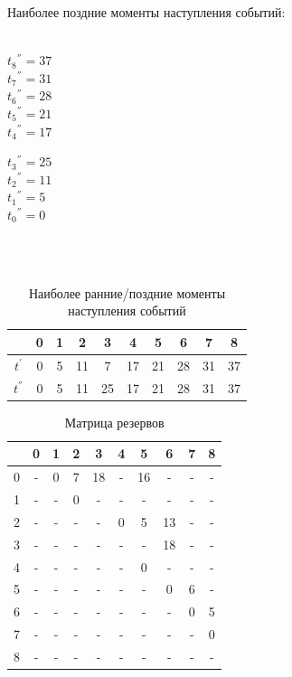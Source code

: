 \documentclass[a4paper,14pt]{extarticle}
\begin{document}
Наиболее поздние моменты наступления событий:\\\\

\begin{minipage}{0.4\textwidth}
\begin{center}
 ${t_8}^{''} = 37$ \\
 ${t_7}^{''} = 31$ \\
 ${t_6}^{''} = 28$ \\
 ${t_5}^{''} = 21$ \\
 ${t_4}^{''} = 17$
\end{center}
\end{minipage}
\hfill
\begin{minipage}{0.5\textwidth}
\begin{center}
 ${t_3}^{''} = 25$ \\
 ${t_2}^{''} = 11$ \\
 ${t_1}^{''} = 5$ \\
 ${t_0}^{''} = 0$
\end{center}
\end{minipage}\\\\

\begin{table}[H]
\caption{Наиболее ранние/поздние моменты наступления событий}
\label{tabular:timesandtenses}
\begin{center}
\begin{tabular}{|c|c|c|c|c|c|c|c|c|c|}
\hline
  & 0 & 1 & 2 & 3 & 4 & 5 & 6 & 7 & 8\\ \hline
${t}^{'}$ & 0 & 5 & 11 & 7 & 17 & 21 & 28 & 31 & 37\\ \hline
${t}^{''}$ & 0 & 5 & 11 & 25 & 17 & 21 & 28 & 31 & 37\\ \hline
\end{tabular}
\end{center}
\end{table}

\begin{table}[H]
\caption{Матрица резервов}
\label{tabular:timesandtenses}
\begin{center}
\begin{tabular}{|c|c|c|c|c|c|c|c|c|c|}
\hline
  & 0 & 1 & 2 & 3 & 4 & 5 & 6 & 7 & 8\\ \hline
0 & - & 0 & 7 & 18 & - & 16 & - & - & -\\ \hline
1 & - & - & 0 & - & - & - & - & - & -\\ \hline
2 & - & - & - & - & 0 & 5 & 13 & - & -\\ \hline
3 & - & - & - & - & - & - & 18 & - & -\\ \hline
4 & - & - & - & - & - & 0 & - & - & -\\ \hline
5 & - & - & - & - & - & - & 0 & 6 & -\\ \hline
6 & - & - & - & - & - & - & - & 0 & 5\\ \hline
7 & - & - & - & - & - & - & - & - & 0\\ \hline
8 & - & - & - & - & - & - & - & - & -\\ \hline
\end{tabular}
\end{center}
\end{table}
\end{document}
